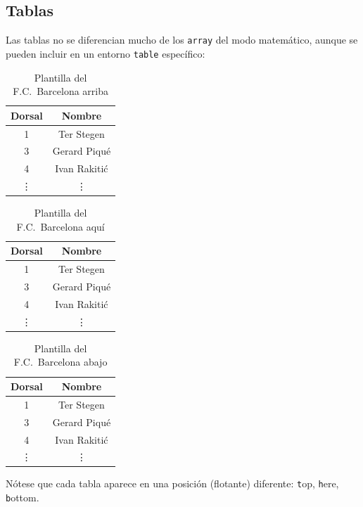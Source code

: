 \documentclass[12pt]{article}
\begin{document}
	\subsection{Tablas}
	Las tablas no se diferencian mucho de los \texttt{array} del modo matemático, aunque se pueden incluir en un entorno \texttt{table} específico:
	\begin{table}[t]
		\begin{center}
			\begin{tabular}{|c|c|}\hline
				Dorsal & Nombre \\ \hline \hline
				1      & Ter Stegen   \\ \hline
				3      & Gerard Piqué \\ \hline
				4      & Ivan Rakitić \\ \hline
				\vdots & \vdots       \\ \hline
			\end{tabular}
		\end{center}
		\caption{Plantilla del F.C.~Barcelona arriba}
	\end{table}
	\begin{table}[h]
		\begin{center}
			\begin{tabular}{|c|c|}\hline
				Dorsal & Nombre \\ \hline \hline
				1      & Ter Stegen   \\ \hline
				3      & Gerard Piqué \\ \hline
				4      & Ivan Rakitić \\ \hline
				\vdots & \vdots       \\ \hline
			\end{tabular}
		\end{center}
		\caption{Plantilla del F.C.~Barcelona aquí}
	\end{table}
	\begin{table}[b]
		\begin{center}
			\begin{tabular}{|c|c|}\hline
				Dorsal & Nombre \\ \hline \hline
				1      & Ter Stegen   \\ \hline
				3      & Gerard Piqué \\ \hline
				4      & Ivan Rakitić \\ \hline
				\vdots & \vdots       \\ \hline
			\end{tabular}
		\end{center}
		\caption{Plantilla del F.C.~Barcelona abajo}
	\end{table}
	Nótese que cada tabla aparece en una posición (flotante) diferente: \texttt{t}op, \texttt{h}ere, \texttt{b}ottom.
\end{document}
